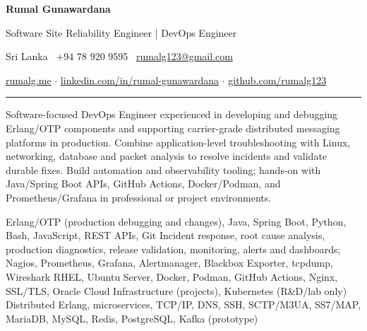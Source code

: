 
\begin{center}
{\Huge\bfseries Rumal Gunawardana}
\vspace{0.12cm}

{\large\color{primary} Software Site Reliability Engineer | DevOps Engineer}
\vspace{0.24cm}

Sri Lanka \textbar\ +94 78 920 9595 \textbar\
\href{mailto:rumalg123@gmail.com}{rumalg123@gmail.com}
\vspace{0.10cm}

\href{https://rumalg.me}{rumalg.me}
\quad$\cdot$\quad
\href{https://www.linkedin.com/in/rumal-gunawardana}{linkedin.com/in/rumal-gunawardana}
\quad$\cdot$\quad
\href{https://github.com/rumalg123}{github.com/rumalg123}
\end{center}
\vspace{0.12cm}\hrule\vspace{0.20cm}


Software-focused DevOps Engineer experienced in developing and debugging Erlang/OTP
components and supporting carrier-grade distributed messaging platforms in production.
Combine application-level troubleshooting with Linux, networking, database and packet
analysis to resolve incidents and validate durable fixes. Build automation and
observability tooling; hands-on with Java/Spring Boot APIs, GitHub Actions,
Docker/Podman, and Prometheus/Grafana in professional or project environments.

{Erlang/OTP (production debugging and changes), Java, Spring Boot, Python, Bash,
JavaScript, REST APIs, Git}
{Incident response, root cause analysis, production diagnostics, release validation,
monitoring, alerts and dashboards; Nagios, Prometheus, Grafana, Alertmanager,
Blackbox Exporter, tcpdump, Wireshark}
{RHEL, Ubuntu Server, Docker, Podman, GitHub Actions, Nginx, SSL/TLS,
Oracle Cloud Infrastructure (projects), Kubernetes (R\&D/lab only)}
\skillCategory{Distributed Systems \& Data}
{Distributed Erlang, microservices, TCP/IP, DNS, SSH, SCTP/M3UA, SS7/MAP,
MariaDB, MySQL, Redis, PostgreSQL, Kafka (prototype)}

